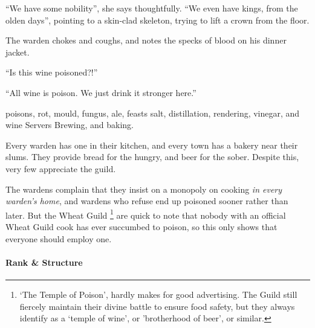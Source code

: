 \begin{multicols}{2}
{    {\sffamily ``We have some nobility''}, she says thoughtfully.
    {\sffamily ``We even have kings, from the olden days''}, pointing to a skin-clad skeleton, trying to lift a crown from the floor.

    The warden chokes and coughs, and notes the specks of blood on his dinner jacket.

    ``Is this wine poisoned?!''

    {\sffamily ``All wine is poison.
    We just drink it stronger here.''}
  }%
  {poisons, rot, mould, fungus, ale, feasts}%
  {salt, distillation, rendering, vinegar, and wine}%
  {Servers}%
  {
    Brewing, and baking.
  }%

Every warden has one in their kitchen, and every town has a bakery near their slums.
They provide bread for the hungry, and beer for the sober.
Despite this, very few appreciate the guild.

The wardens complain that they insist on a monopoly on cooking \emph{in every warden's home}, and wardens who refuse end up poisoned sooner rather than later.
But the Wheat Guild%
\footnote{`The Temple of Poison', hardly makes for good advertising. The Guild still fiercely maintain their divine battle to ensure food safety, but they always identify as a `temple of wine', or 'brotherhood of beer', or similar.}
are quick to note that nobody with an official Wheat Guild cook has ever succumbed to poison, so this only shows that everyone should employ one.

\paragraph{Rank \& Structure}


\end{multicols}
